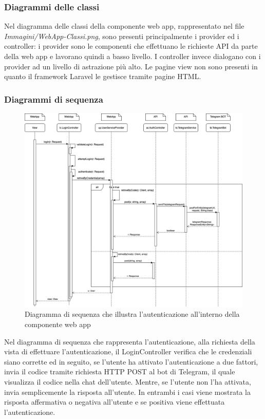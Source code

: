 	\subsubsection{Diagrammi delle classi}%
	Nel diagramma delle classi della componente web app, rappresentato nel file \textit{Immagini/WebApp-Classi.png}, sono presenti principalmente i provider ed i controller: i provider sono le componenti che effettuano le richieste API da parte della web app e lavorano quindi a basso livello. I controller invece dialogano con i provider ad un livello di astrazione più alto. Le pagine view non sono presenti in quanto il framework Laravel le gestisce tramite pagine HTML.
	\begin{landscape}
	\subsubsection{Diagrammi di sequenza}%
		\begin{figure}[H]
			\centering
			\includegraphics[scale=0.400]{res/images/WEBAPP/AutenticazioneTfa.png}
			\caption{Diagramma di sequenza che illustra l'autenticazione all'interno della componente web app}
			\label{Diagramma 23}
		\end{figure}
		Nel diagramma di sequenza che rappresenta l'autenticazione, alla richiesta della vista di effettuare l'autenticazione, il LoginController verifica che le credenziali siano corrette ed in seguito, se l'utente ha attivato l'autenticazione a due fattori, invia il codice tramite richiesta HTTP POST al bot di Telegram, il quale visualizza il codice nella chat dell'utente. Mentre, se l'utente non l'ha attivata, invia semplicemente la risposta all'utente. In entrambi i casi viene mostrata la risposta affermativa o negativa all'utente e se positiva viene effettuata l'autenticazione.

\end{landscape}
